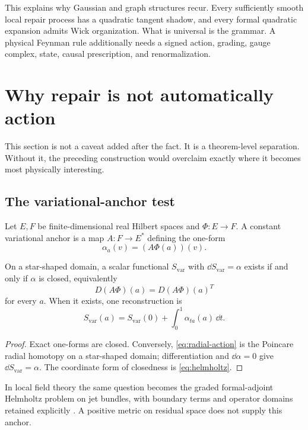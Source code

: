 \documentclass[11pt,a4paper]{article}
\begin{document}
This explains why Gaussian and graph structures recur.  Every sufficiently
smooth local repair process has a quadratic tangent shadow, and every formal
quadratic expansion admits Wick organization.  What is universal is the
grammar.  A physical Feynman rule additionally needs a signed action,
grading, gauge complex, state, causal prescription, and renormalization.

\section{Why repair is not automatically action}
\label{sec:action-boundary}

This section is not a caveat added after the fact.  It is a theorem-level
separation.  Without it, the preceding construction would overclaim exactly
where it becomes most physically interesting.

\subsection{The variational-anchor test}

Let \(E,F\) be finite-dimensional real Hilbert spaces and
\(\Phi:E\to F\).  A constant variational anchor is a map
\(A:F\to E^*\) defining the one-form
\[
\alpha_a(v)=(A\Phi(a))(v).
\]

\begin{theorem}
\label{thm:helmholtz}
On a star-shaped domain, a scalar functional \(S_{\mathrm{var}}\) with
\(\dd S_{\mathrm{var}}=\alpha\) exists if and only if \(\alpha\) is closed,
equivalently
\begin{equation}
D(A\Phi)(a)=D(A\Phi)(a)^{T}
\label{eq:helmholtz}
\end{equation}
for every \(a\).  When it exists, one reconstruction is
\begin{equation}
S_{\mathrm{var}}(a)=S_{\mathrm{var}}(0)
+\int_0^1\alpha_{ta}(a)\,\dd t.
\label{eq:radial-action}
\end{equation}
\end{theorem}

\begin{proof}
Exact one-forms are closed.  Conversely,
\eqref{eq:radial-action} is the Poincare radial homotopy on a star-shaped
domain; differentiation and \(\dd\alpha=0\) give
\(\dd S_{\mathrm{var}}=\alpha\).  The coordinate form of closedness is
\eqref{eq:helmholtz}.
\end{proof}

In local field theory the same question becomes the graded formal-adjoint
Helmholtz problem on jet bundles, with boundary terms and operator domains
retained explicitly \cite{Voronov2003}.  A positive metric on residual space
does not supply this anchor.
\end{document}
